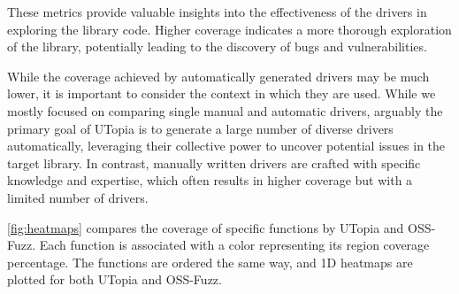 \documentclass[a4paper,11pt,oneside]{report}
\begin{document}
These metrics provide valuable insights into the effectiveness of 
the drivers in exploring the library code. Higher coverage indicates 
a more thorough exploration of the library, potentially leading to 
the discovery of bugs and vulnerabilities.

While the coverage achieved by automatically generated drivers 
may be much lower, it is important to consider the context in 
which they are used. While we mostly focused on comparing single
manual and automatic drivers, arguably the primary goal of UTopia is to 
generate a large number of diverse drivers automatically, 
leveraging their collective power to uncover potential issues 
in the target library. In contrast, manually written drivers 
are crafted with specific knowledge and expertise, which often 
results in higher coverage but with a limited number of drivers.

\autoref{fig:heatmaps} compares the coverage of specific functions 
by UTopia and OSS-Fuzz. Each function is associated with a color representing 
its region coverage percentage. The functions are ordered the same way, 
and 1D heatmaps are plotted for both UTopia and OSS-Fuzz.
\end{document}
